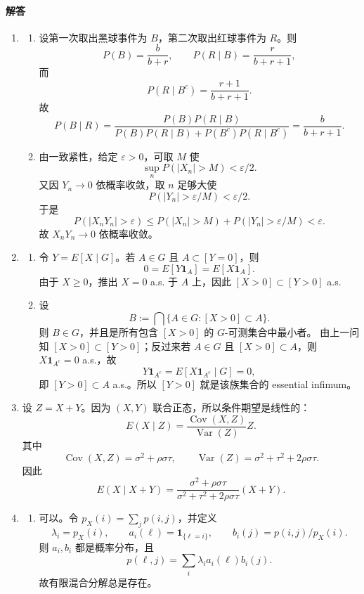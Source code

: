 \documentclass[UTF8,12pt]{ctexart}
\begin{document}
\paragraph{解答}
\begin{enumerate}[label=\textbf{\arabic*.},leftmargin=2.2em]
\item
\begin{enumerate}[label=\textbf{\arabic*)},leftmargin=2.4em]
\item 设第一次取出黑球事件为 $B$，第二次取出红球事件为 $R$。则
\[
P(B)=\frac{b}{b+r},\qquad P(R\mid B)=\frac{r}{b+r+1},
\]
而
\[
P(R\mid B^c)=\frac{r+1}{b+r+1}.
\]
故
\[
P(B\mid R)=\frac{P(B)P(R\mid B)}{P(B)P(R\mid B)+P(B^c)P(R\mid B^c)}
=\frac{b}{b+r+1}.
\]

\item 由一致紧性，给定 $\varepsilon>0$，可取 $M$ 使
\[
\sup_nP(|X_n|>M)<\varepsilon/2.
\]
又因 $Y_n\to0$ 依概率收敛，取 $n$ 足够大使
\[
P(|Y_n|>\varepsilon/M)<\varepsilon/2.
\]
于是
\[
P(|X_nY_n|>\varepsilon)\le P(|X_n|>M)+P(|Y_n|>\varepsilon/M)<\varepsilon.
\]
故 $X_nY_n\to0$ 依概率收敛。
\end{enumerate}

\item
\begin{enumerate}[label=\textbf{\arabic*)},leftmargin=2.4em]
\item 令 $Y=E[X\mid G]$。若 $A\in G$ 且 $A\subset [Y=0]$，则
\[
0=E[Y\mathbf 1_A]=E[X\mathbf 1_A].
\]
由于 $X\ge0$，推出 $X=0$ a.s. 于 $A$ 上，因此 $[X>0]\subset[Y>0]$ a.s.

\item 设
\[
B:=\bigcap\{A\in G:[X>0]\subset A\}.
\]
则 $B\in G$，并且是所有包含 $[X>0]$ 的 $G$-可测集合中最小者。
由上一问知 $[X>0]\subset[Y>0]$；反过来若 $A\in G$ 且 $[X>0]\subset A$，则 $X\mathbf1_{A^c}=0$ a.s.，故
\[
Y\mathbf1_{A^c}=E[X\mathbf1_{A^c}\mid G]=0,
\]
即 $[Y>0]\subset A$ a.s.。所以 $[Y>0]$ 就是该族集合的 essential infimum。
\end{enumerate}

\item 设 $Z=X+Y$。因为 $(X,Y)$ 联合正态，所以条件期望是线性的：
\[
E(X\mid Z)=\frac{\operatorname{Cov}(X,Z)}{\operatorname{Var}(Z)}Z.
\]
其中
\[
\operatorname{Cov}(X,Z)=\sigma^2+\rho\sigma\tau,
\qquad
\operatorname{Var}(Z)=\sigma^2+\tau^2+2\rho\sigma\tau.
\]
因此
\[
E(X\mid X+Y)=\frac{\sigma^2+\rho\sigma\tau}{\sigma^2+\tau^2+2\rho\sigma\tau}(X+Y).
\]

\item
\begin{enumerate}[label=\textbf{\arabic*)},leftmargin=2.4em]
\item 可以。令 $p_X(i)=\sum_j p(i,j)$，并定义
\[
\lambda_i=p_X(i),\qquad a_i(\ell)=\mathbf 1_{\{\ell=i\}},\qquad b_i(j)=p(i,j)/p_X(i).
\]
则 $a_i,b_i$ 都是概率分布，且
\[
p(\ell,j)=\sum_i \lambda_i a_i(\ell)b_i(j).
\]
故有限混合分解总是存在。


\end{enumerate}
\end{enumerate}
\end{document}
